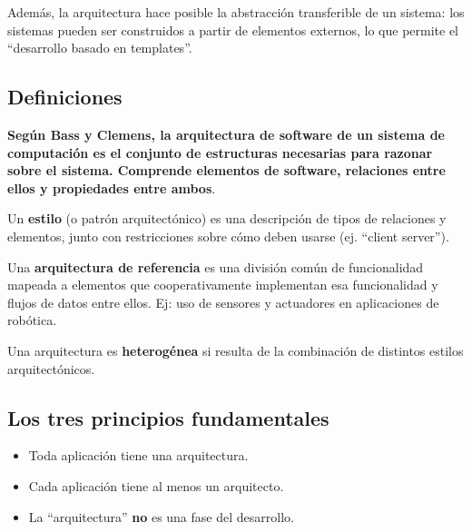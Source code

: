 \documentclass[]{article}
\begin{document}
Además, la arquitectura hace posible la abstracción transferible de un sistema: los sistemas pueden ser construidos a partir de elementos externos, lo que permite el ``desarrollo basado en templates''.

\subsection{Definiciones}
\textbf{Según Bass y Clemens, la arquitectura de software de un sistema de computación es el conjunto de estructuras necesarias para razonar sobre el sistema. Comprende elementos de software, relaciones entre ellos y propiedades entre ambos}.

Un \textbf{estilo} (o patrón arquitectónico) es una descripción de tipos de relaciones y elementos, junto con restricciones sobre cómo deben usarse (ej. ``client server'').

Una \textbf{arquitectura de referencia} es una división común de funcionalidad mapeada a elementos que cooperativamente implementan esa funcionalidad y flujos de datos entre ellos. Ej: uso de sensores y actuadores en aplicaciones de robótica.

Una arquitectura es \textbf{heterogénea} si resulta de la combinación de distintos estilos arquitectónicos.

\subsection{Los tres principios fundamentales}
\begin{itemize}
	\item Toda aplicación tiene una arquitectura.
	\item Cada aplicación tiene al menos un arquitecto.
	\item La ``arquitectura'' \textbf{no} es una fase del desarrollo.
\end{itemize}
\end{document}
